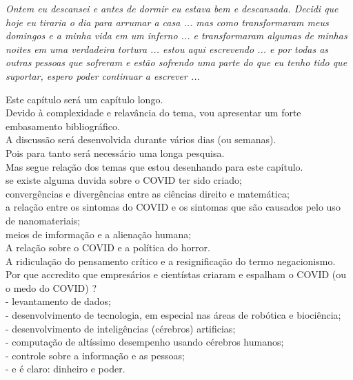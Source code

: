 \documentclass[11pt]{book}
\begin{document}
\noindent \begin{center} \emph{Ontem eu descansei e antes de dormir eu estava bem e descansada. Decidi que hoje eu tiraria o dia para arrumar a casa ... mas como transformaram meus domingos e a minha vida em um inferno ... e transformaram algumas de minhas noites em uma verdadeira tortura ... estou aqui escrevendo ... e por todas as outras pessoas que sofreram e estão sofrendo uma parte do que eu tenho tido que suportar, espero poder continuar a escrever ...} \end{center}

Este capítulo será um capítulo longo. \\
Devido à complexidade e relavância do tema, vou apresentar um forte embasamento bibliográfico. \\
A discussão será desenvolvida durante vários dias (ou semanas). \\
Pois para tanto será necessário uma longa pesquisa. \\

Mas segue relação dos temas que estou desenhando para este capítulo. \\

se existe alguma duvida sobre o COVID ter sido criado; \\
convergências e divergências entre as ciências direito e matemática; \\
a relação entre os sintomas do COVID e os sintomas que são causados pelo uso de nanomateriais; \\
meios de imformação e a alienação humana; \\
A relação sobre o COVID e a política do horror. \\

A ridiculação do pensamento crítico e a resignificação do termo negacionismo. \\

Por que accredito que empresários e cientístas criaram e espalham o COVID (ou o medo do COVID) ? \\

- levantamento de dados; \\
- desenvolvimento de tecnologia, em especial nas áreas de robótica e biociência; \\
- desenvolvimento de inteligências (cérebros) artificias; \\
- computação de altíssimo desempenho usando cérebros humanos; \\
- controle sobre a informação e as pessoas; \\
- e é claro: dinheiro e poder.
\end{document}
